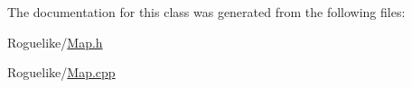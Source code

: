 The documentation for this class was generated from the following files\-:\begin{DoxyCompactItemize}
\item 
Roguelike/\hyperlink{_map_8h}{Map.\-h}\item 
Roguelike/\hyperlink{_map_8cpp}{Map.\-cpp}\end{DoxyCompactItemize}
